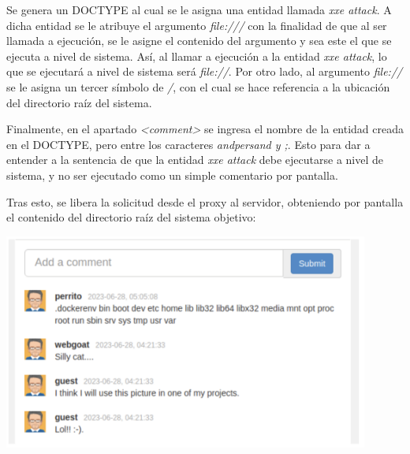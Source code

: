 \documentclass[12pt,oneside,a4paper]{book}
\begin{document}
\begin{enumerate}
\begin{enumerate}
        \vspace{2em}

        \hspace{20pt}
        Se genera un DOCTYPE al cual se le asigna una entidad llamada \textit{xxe attack}. A dicha entidad se le atribuye el argumento \textit{file:///} con la finalidad de que al ser llamada a ejecución, se le asigne el contenido del argumento y sea este el que se ejecuta a nivel de sistema. Así, al llamar a ejecución a la entidad \textit{xxe attack}, lo que se ejecutará a nivel de sistema será \textit{file://}. Por otro lado, al argumento \textit{file://} se le asigna un tercer símbolo de \textit{/}, con el cual se hace referencia a la ubicación del directorio raíz del sistema.

        \newpage

        \hspace{20pt}
        Finalmente, en el apartado \textit{<comment>} se ingresa el nombre de la entidad creada en el DOCTYPE, pero entre los caracteres \textit{andpersand y ;}. Esto para dar a entender a la sentencia de que la entidad \textit{xxe attack} debe ejecutarse a nivel de sistema, y no ser ejecutado como un simple comentario por pantalla.

        \vspace{1em}

        \hspace{20pt}
        Tras esto, se libera la solicitud desde el proxy al servidor, obteniendo por pantalla el contenido del directorio raíz del sistema objetivo:

        \vspace{2em}

        \begin{center}
            \includegraphics[width=12cm]{img/xxe3.png}
            

\end{center}
\end{enumerate}
\end{enumerate}
\end{document}
